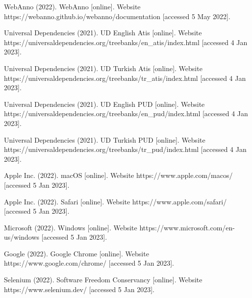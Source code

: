 \begin{thebibliography}{99}
 WebAnno (2022). WebAnno [online]. Website https://webanno.github.io/webanno/documentation [accessed 5 May 2022].

 Universal Dependencies (2021). UD English Atis [online]. Website https://universaldependencies.org/treebanks/en\_atis/index.html [accessed 4 Jan 2023].

 Universal Dependencies (2021). UD Turkish Atis [online]. Website https://universaldependencies.org/treebanks/tr\_atis/index.html [accessed 4 Jan 2023].

 Universal Dependencies (2021). UD English PUD [online]. Website https://universaldependencies.org/treebanks/en\_pud/index.html [accessed 4 Jan 2023].

 Universal Dependencies (2021). UD Turkish PUD [online]. Website https://universaldependencies.org/treebanks/tr\_pud/index.html [accessed 4 Jan 2023].

 Apple Inc. (2022). macOS [online]. Website https://www.apple.com/macos/ [accessed 5 Jan 2023].

 Apple Inc. (2022). Safari [online]. Website https://www.apple.com/safari/ [accessed 5 Jan 2023].

 Microsoft (2022). Windows [online]. Website https://www.microsoft.com/en-us/windows [accessed 5 Jan 2023].

 Google (2022). Google Chrome [online]. Website https://www.google.com/chrome/ [accessed 5 Jan 2023].

 Selenium (2022). Software Freedom Conservancy [online]. Website https://www.selenium.dev/ [accessed 5 Jan 2023].

\end{thebibliography}
